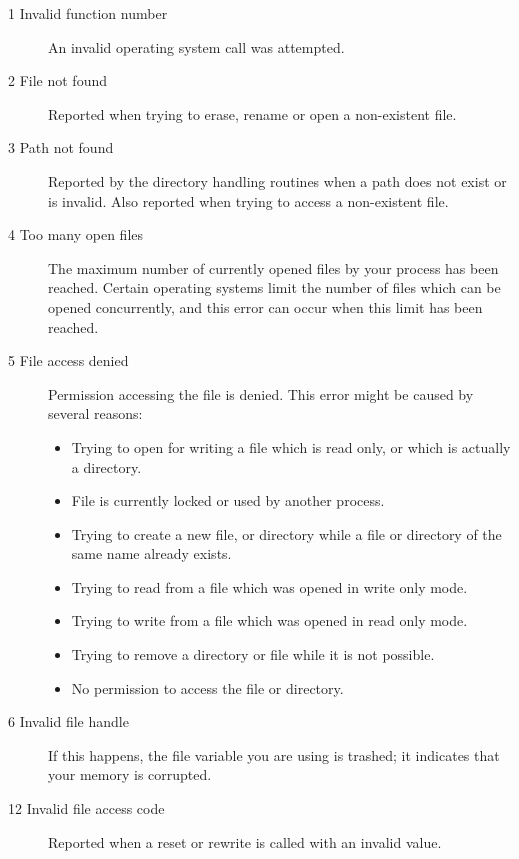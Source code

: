\begin{description}
\item [1  Invalid function number]
An invalid operating system call was attempted.

\item [2  File not found]
Reported when trying to erase, rename or open a non-existent
file.

\item [3  Path not found]
Reported by the directory handling routines when a path does not 
exist or is invalid. Also reported when trying to access a 
non-existent file.

\item [4  Too many open files]
The maximum number of currently opened files by your process
has been reached. Certain operating systems limit the number
of files which can be opened concurrently, and this error
can occur when this limit has been reached.

\item [5  File access denied]
Permission accessing the file is denied. This error might
be caused by several reasons:
    \begin{itemize}
       \item   Trying to open for writing a file which is
               read only, or which is actually a directory.
       \item   File is currently locked or used by another process.
       \item   Trying to create a new file, or directory while a 
               file or directory of the same name already exists.
       \item   Trying to read from a file which was opened
               in write only mode.
       \item   Trying to write from a file which was opened
               in read only mode.
       \item   Trying to remove a directory or file while
               it is not possible.
       \item   No permission to access the file or directory.        
    \end{itemize}

\item [6  Invalid file handle]
If this happens, the file variable you are using is trashed; it
indicates that your memory is corrupted.

\item [12  Invalid file access code]
Reported when a reset or rewrite is called with an invalid 
value.


\end{description}
